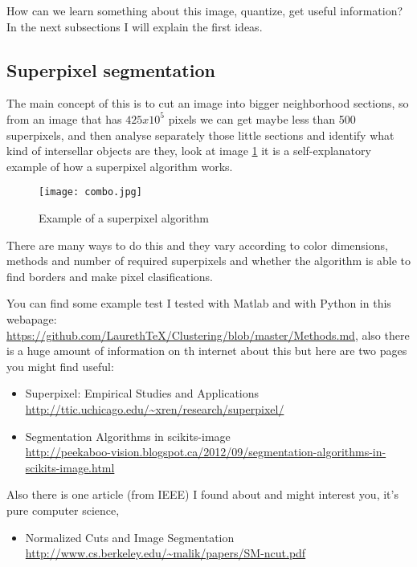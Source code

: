 \documentclass[11pt,fleqn]{book} %
\begin{document}
How can we learn something about this image, quantize, get useful information? In the next subsections I will explain the first ideas.

\subsection{Superpixel segmentation}
The main concept of this is to cut an image into bigger neighborhood sections, so from an image that has $425x10^5$ pixels we can get maybe less than 500 superpixels, and then analyse separately those little sections and identify what kind of intersellar objects are they, look at image \ref{fig:super} it is a self-explanatory example of how a superpixel algorithm works.
\begin{figure}[h]
    \centering
    \texttt{[image: combo.jpg]}
    \caption{Example of a superpixel algorithm}
    \label{fig:super}
\end{figure}
There are many ways to do this and they vary according to color dimensions, methods and number of required superpixels and whether the algorithm is able to find borders and make pixel clasifications.

\begin{remark}
	You can find some example test I tested with Matlab and with Python in this webapage: \url{https://github.com/LaurethTeX/Clustering/blob/master/Methods.md}, also there is a huge amount of information on th internet about this but here are two pages you might find useful:
    \begin{itemize}
    	\item Superpixel: Empirical Studies and Applications \\ \url{http://ttic.uchicago.edu/~xren/research/superpixel/}
        \item Segmentation Algorithms in scikits-image \\ \url{http://peekaboo-vision.blogspot.ca/2012/09/segmentation-algorithms-in-scikits-image.html}
    \end{itemize}
    Also there is one article (from IEEE) I found about and might interest you, it's pure computer science,
    \begin{itemize}
    	\item Normalized Cuts and Image Segmentation \\ \url{http://www.cs.berkeley.edu/~malik/papers/SM-ncut.pdf}
    \end{itemize}
\end{remark}
\end{document}
